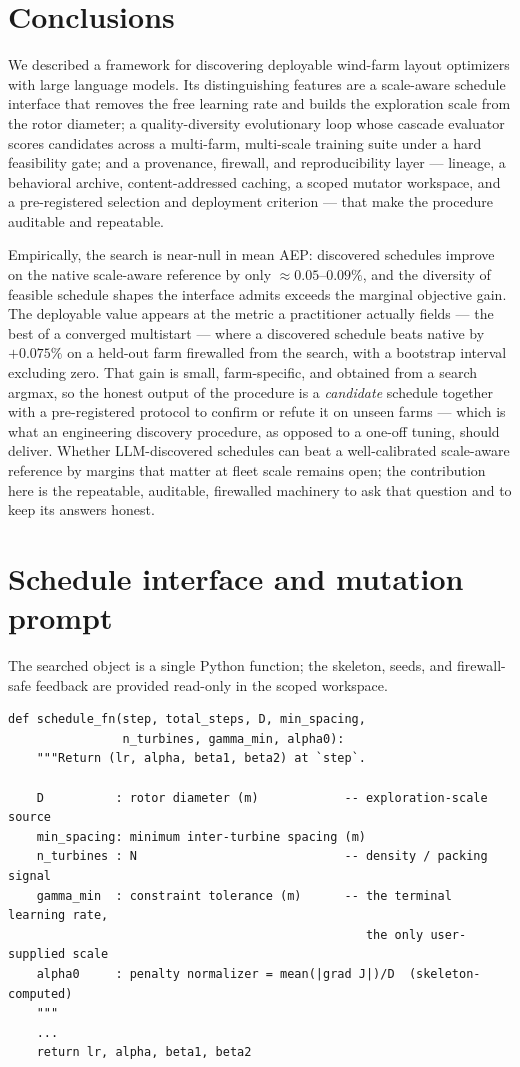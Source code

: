 \documentclass[11pt]{article}
\begin{document}
\section{Conclusions}
\label{sec:conclusions}
We described a framework for discovering deployable wind-farm layout optimizers with
large language models. Its distinguishing features are a scale-aware schedule
interface that removes the free learning rate and builds the exploration scale from the
rotor diameter; a quality-diversity evolutionary loop whose cascade evaluator scores
candidates across a multi-farm, multi-scale training suite under a hard feasibility
gate; and a provenance, firewall, and reproducibility layer --- lineage, a behavioral
archive, content-addressed caching, a scoped mutator workspace, and a pre-registered
selection and deployment criterion --- that make the procedure auditable and
repeatable.

Empirically, the search is near-null in mean AEP: discovered schedules improve on the
native scale-aware reference by only $\approx\!0.05$--$0.09\%$, and the diversity of
feasible schedule shapes the interface admits exceeds the marginal objective gain. The
deployable value appears at the metric a practitioner actually fields --- the best of a
converged multistart --- where a discovered schedule beats native by $+0.075\%$ on a
held-out farm firewalled from the search, with a bootstrap interval excluding zero. That
gain is small, farm-specific, and obtained from a search argmax, so the honest output of
the procedure is a \emph{candidate} schedule together with a pre-registered protocol to
confirm or refute it on unseen farms --- which is what an engineering discovery procedure,
as opposed to a one-off tuning, should deliver. Whether LLM-discovered schedules can beat
a well-calibrated scale-aware reference by margins that matter at fleet scale remains open;
the contribution here is the repeatable, auditable, firewalled machinery to ask that
question and to keep its answers honest.

\appendix
\section{Schedule interface and mutation prompt}
\label{app:iface}
The searched object is a single Python function; the skeleton, seeds, and firewall-safe
feedback are provided read-only in the scoped workspace.

\begin{lstlisting}
def schedule_fn(step, total_steps, D, min_spacing,
                n_turbines, gamma_min, alpha0):
    """Return (lr, alpha, beta1, beta2) at `step`.

    D          : rotor diameter (m)            -- exploration-scale source
    min_spacing: minimum inter-turbine spacing (m)
    n_turbines : N                             -- density / packing signal
    gamma_min  : constraint tolerance (m)      -- the terminal learning rate,
                                                  the only user-supplied scale
    alpha0     : penalty normalizer = mean(|grad J|)/D  (skeleton-computed)
    """
    ...
    return lr, alpha, beta1, beta2
\end{lstlisting}
\end{document}

